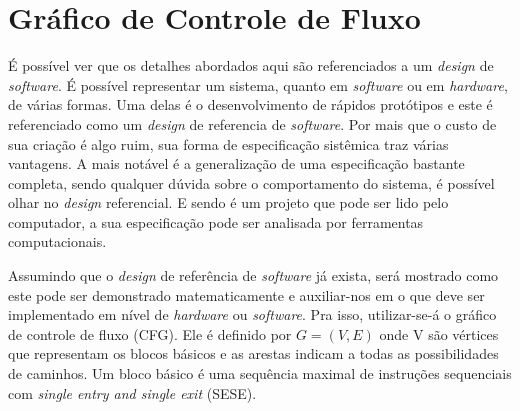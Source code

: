 \section{Gráfico de Controle de Fluxo}



É possível ver que os detalhes abordados aqui são referenciados a um \textit{design} de \textit{software}. É possível representar um sistema, quanto em \textit{software} ou em \textit{hardware}, de várias formas. Uma delas é o desenvolvimento de rápidos protótipos e este é referenciado como um \textit{design} de referencia de \textit{software}. Por mais que o custo de sua criação é algo ruim, sua forma de especificação sistêmica traz várias vantagens. A mais notável é a generalização de uma especificação bastante completa, sendo qualquer dúvida sobre o comportamento do sistema, é possível olhar no \textit{design} referencial. E sendo é um projeto que pode ser lido pelo computador, a sua especificação pode ser analisada por ferramentas computacionais.

Assumindo que o \textit{design} de referência de \textit{software} já exista, será mostrado como este pode ser demonstrado matematicamente e auxiliar-nos em o que deve ser implementado em nível de \textit{hardware} ou \textit{software}. Pra isso, utilizar-se-á o gráfico de controle de fluxo (CFG). Ele é definido por $ G = (V, E) $ onde V são vértices que representam os blocos básicos e as arestas indicam a todas as possibilidades de caminhos. Um bloco básico é uma sequência maximal de instruções sequenciais com \textit{single entry and single exit} (SESE).



